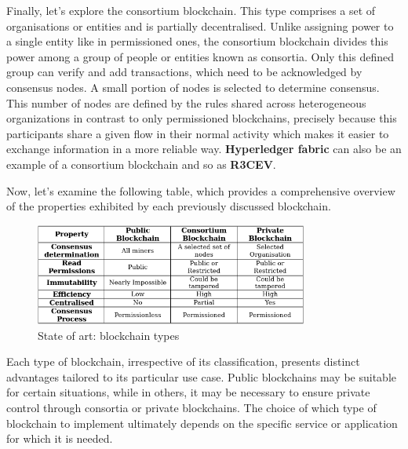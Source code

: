 Finally, let's explore the consortium blockchain. This type comprises a set of organisations or entities and is partially decentralised. Unlike assigning power to a single entity like in permissioned ones, the consortium blockchain divides this power among a group of people or entities known as consortia. Only this defined group can verify and add transactions, which need to be acknowledged by consensus nodes. A small portion of nodes is selected to determine consensus. This number of nodes are defined by the rules shared across heterogeneous organizations in contrast to only permissioned blockchains, precisely because this participants share a given flow in their normal activity which makes it easier to exchange information in a more reliable way. \textbf{Hyperledger fabric} can also be an example of a consortium blockchain and so as  \textbf{R3CEV}.

Now, let's examine the following table, which provides a comprehensive overview of the properties exhibited by each previously discussed blockchain.

\begin{figure}[H]
	\centering
	\includegraphics[width=0.8\textwidth]{assets/state-of-art/type-blockchains.png} %
	\caption{State of art: blockchain types}
	\label{fig:sample-image} 
\end{figure}

Each type of blockchain, irrespective of its classification, presents distinct advantages tailored to its particular use case. Public blockchains may be suitable for certain situations, while in others, it may be necessary to ensure private control through consortia or private blockchains. The choice of which type of blockchain to implement ultimately depends on the specific service or application for which it is needed.

